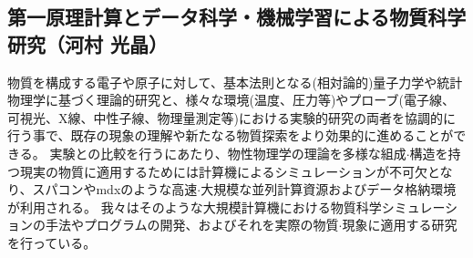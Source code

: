 \subsection{第一原理計算とデータ科学・機械学習による物質科学研究（河村 光晶）}

物質を構成する電子や原子に対して、基本法則となる(相対論的)量子力学や統計物理学に基づく理論的研究と、様々な環境(温度、圧力等)やプローブ(電子線、可視光、X線、中性子線、物理量測定等)における実験的研究の両者を協調的に行う事で、既存の現象の理解や新たなる物質探索をより効果的に進めることができる。
実験との比較を行うにあたり、物性物理学の理論を多様な組成$\cdot$構造を持つ現実の物質に適用するためには計算機によるシミュレーションが不可欠となり、スパコンやmdxのような高速$\cdot$大規模な並列計算資源およびデータ格納環境が利用される。
我々はそのような大規模計算機における物質科学シミュレーションの手法やプログラムの開発、およびそれを実際の物質$\cdot$現象に適用する研究を行っている。
~\cite{kawamura_hanai_tone_continuousp}
~\cite{kawamura_hphi}
~\cite{kawamura_wo2}
~\cite{kawamura_kmgh3}
~\cite{kawamura_omax}
~\cite{kawamura_pdcu111}